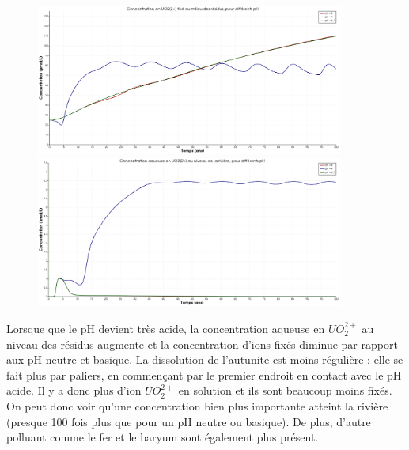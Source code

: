 \documentclass{article}
\begin{document}
\begin{figure}[H]
    \centering
    \begin{minipage}{0.5\textwidth}
        \centering
        \includegraphics[width=0.9\textwidth]{III_B_2_11.png} 
        \caption{}
        \label{fig:UO2_fixe_rsidus_comparaison}
    \end{minipage}\hfill
    \begin{minipage}{0.5\textwidth}
        \centering
        \includegraphics[width=0.9\textwidth]{III_B_2_12.png} 
        \caption{}
        \label{fig:UO2_riviere_comparaison}
    \end{minipage}
\end{figure}


Lorsque que le pH devient très acide, la concentration aqueuse en $UO_2^{2+}$ au niveau des résidus augmente et la concentration d’ions fixés diminue par rapport aux pH neutre et basique. La dissolution de l’autunite est moins régulière : elle se fait plus par paliers, en commençant par le premier endroit en contact avec le pH acide. Il y a donc plus d’ion $UO_2^{2+}$ en solution et ils sont beaucoup moins fixés. On peut donc voir qu’une concentration bien plus importante atteint la rivière (presque 100 fois plus que pour un pH neutre ou basique). De plus, d’autre polluant comme le fer et le baryum sont également plus présent.
\end{document}

